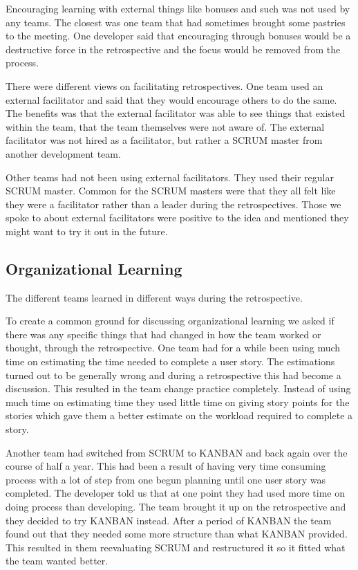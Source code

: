 \label{question-9}
Encouraging learning with external things like bonuses and such was not used by any teams. The closest was one team that had sometimes brought some pastries to the meeting. One developer said that encouraging through bonuses would be a destructive force in the retrospective and the focus would be removed from the process.

\label{question-10}
There were different views on facilitating retrospectives. One team used an external facilitator and said that they would encourage others to do the same. The benefits was that the external facilitator was able to see things that existed within the team, that the team themselves were not aware of. The external facilitator was not hired as a facilitator, but rather a SCRUM master from another development team.

Other teams had not been using external facilitators. They used their regular SCRUM master. Common for the SCRUM masters were that they all felt like they were a facilitator rather than a leader during the retrospectives. Those we spoke to about external facilitators were positive to the idea and mentioned they might want to try it out in the future. 

\subsection{Organizational Learning} %
\label{sub:organizational_learning}
The different teams learned in different ways during the retrospective.

\label{question-11}
To create a common ground for discussing organizational learning we asked if there was any specific things that had changed in how the team worked or thought, through the retrospective. One team had for a while been using much time on estimating the time needed to complete a user story. The estimations turned out to be generally wrong and during a retrospective this had become a discussion. This resulted in the team change practice completely. Instead of using much time on estimating time they used little time on giving story points for the stories which gave them a better estimate on the workload required to complete a story. 

Another team had switched from SCRUM to KANBAN and back again over the course of half a year. This had been a result of having very time consuming process with a lot of step from one begun planning until one user story was completed. The developer told us that at one point they had used more time on doing process than developing. The team brought it up on the retrospective and they decided to try KANBAN instead. After a period of KANBAN the team found out that they needed some more structure than what KANBAN provided. This resulted in them reevaluating SCRUM and restructured it so it fitted what the team wanted better. 

